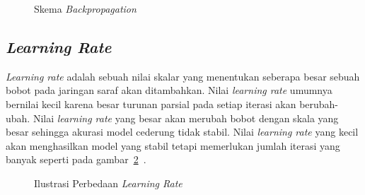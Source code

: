 \begin{figure}[htbp]
    \begin{center}
    \end{center}
    \vspace{-20pt}
    \captionsetup{labelfont=bf, textfont=bf}
    \caption{Skema \textit{Backpropagation}}
    \vspace{-10pt}
    \captionsetup{labelfont=md, textfont=md}
    \label{fig:backprop}
\end{figure}

\subsection{\textit{Learning Rate}}

\textit{Learning rate} adalah sebuah nilai skalar yang menentukan seberapa besar sebuah bobot pada
jaringan saraf akan ditambahkan. Nilai \textit{learning rate} umumnya bernilai kecil karena
besar turunan parsial pada setiap iterasi akan berubah-ubah. Nilai \textit{learning rate} yang besar
akan merubah bobot dengan skala yang besar sehingga akurasi model cederung tidak stabil. Nilai
\textit{learning rate} yang kecil akan menghasilkan model yang stabil tetapi memerlukan jumlah iterasi
yang banyak seperti pada gambar~\ref{fig:lr}~\cite{2019arXiv190801878Y}.

\begin{figure}[htbp]
    \begin{center}
    \end{center}
    \vspace{-20pt}
    \captionsetup{labelfont=bf, textfont=bf}
    \caption{Ilustrasi Perbedaan \textit{Learning Rate}}
    \vspace{-10pt}
    \captionsetup{labelfont=md, textfont=md}
    \label{fig:lr}
\end{figure}

